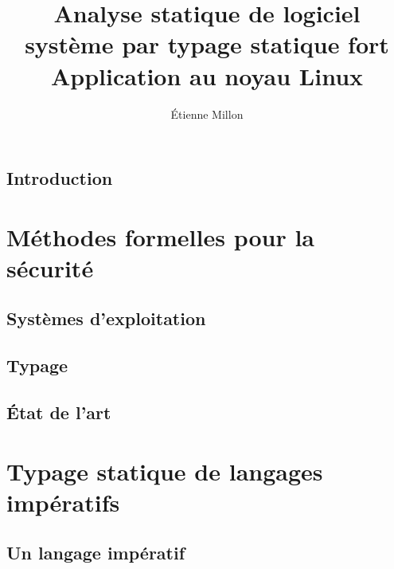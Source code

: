 \documentclass[a4paper,11pt]{memoir}
\title{ \bfseries\LARGE Analyse statique de logiciel système par typage statique fort\\%
      {\mdseries\Large Application au noyau Linux}}
\author{Étienne Millon}
\begin{document}
\frontmatter

\maketitle

\cleartorecto

\asuabstract



\asuacknowledgements




\tableofcontents

\mainmatter

\chapter{Introduction}


\part{Méthodes formelles pour la sécurité}

\chapter{Systèmes d'exploitation}

\label{cha:os}


\chapter{Typage}



\chapter{État de l'art}



\part{Typage statique de langages impératifs}

\chapter{Un langage impératif}
\end{document}
